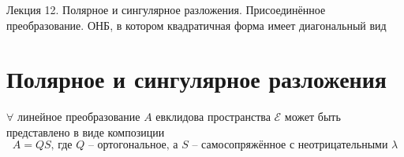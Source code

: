 \documentclass[11pt]{article}
\begin{document}
\begin{titlepage}
    \centering
    \vspace*{\fill}  %

    {\Huge Лекция 12. Полярное и сингулярное разложения. 
    Присоединённое преобразование. ОНБ, в котором квадратичная форма 
    имеет диагональный вид
    \par}

    \vspace*{\fill}  %
\end{titlepage}

\setcounter{page}{1}

\section{Полярное и сингулярное разложения}

\begin{theorem}
    $\forall$ линейное преобразование $A$ евклидова пространства $\mathcal{E}$ 
    может быть представлено в виде композиции 
    \[A = QS \text{, где } Q \text{ -- ортогональное, а } S \text{ -- 
    самосопряжённое с неотрицательными } \lambda\]  
\end{theorem}
\end{document}
